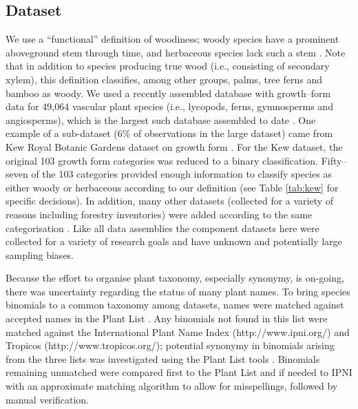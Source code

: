 \documentclass[a4paper,12pt]{article}
\begin{document}
\subsection{Dataset}

We use a ``functional'' definition of woodiness; woody species have a
prominent aboveground stem through time, and herbaceous species lack
such a stem \citep[see an early use of this definition
by][]{gray1887elements}.  Note that in addition to species producing
true wood (i.e., consisting of secondary xylem), this definition
classifies, among other groups, palms, tree ferns and bamboo as
woody.
%
We used a recently assembled database with growth--form data for 49,064
vascular plant species (i.e., lycopods, ferns,
gymnosperms and angiosperms), which is the largest such database assembled
to date \citep{Zanne}. 
%
One example of a sub-dataset (6\% of observations in the large dataset) came from Kew Royal Botanic
Gardens dataset on growth form \citep{Kew}.  For the Kew dataset, the
original 103 growth form categories was reduced to a binary
classification.  Fifty--seven of the 103 categories provided enough
information to classify species as either woody or herbaceous
according to our definition (see Table \ref{tab:kew} for specific
decisions).  In addition, many other datasets (collected for a
variety of reasons including forestry inventories) were added
according to the same categorisation \citep{Zanne}.  Like all data
assemblies the component datasets here were collected for a variety of
research goals and have unknown and potentially large sampling biases.

Because the effort to organise plant taxonomy, especially synonymy, is
on-going, there was uncertainty regarding the status of many plant
names.
%
To bring species binomials to a common taxonomy among datasets, names
were matched against accepted names in the Plant List
\citep{ThePlantList}.  Any binomials not found in this list were
matched against the International Plant Name Index
(http://www.ipni.org/) and Tropicos (http://www.tropicos.org/);
potential synonymy in binomials arising from the three lists was
investigated using the Plant List tools \citep{ThePlantList}.  
%
Binomials remaining unmatched were compared first to the Plant List
and if needed to IPNI with an approximate matching algorithm to allow
for misspellings, followed by manual verification.
\end{document}
